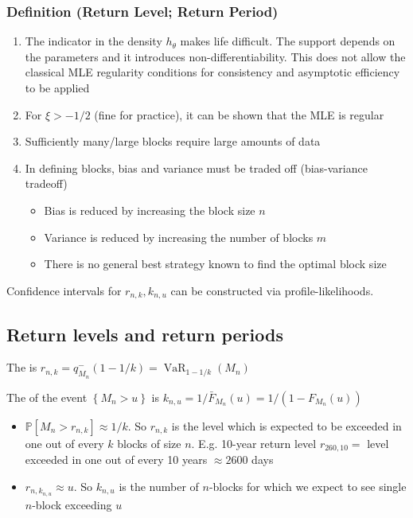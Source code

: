 \subsubsection*{Definition (Return Level; Return Period)}
\begin{enumerate}[label = (\arabic*), leftmargin=*]
    \item The indicator in the density $h_{\theta}$ makes life difficult. The support depends on the parameters and it introduces non-differentiability. This does not allow the classical MLE regularity conditions for consistency and asymptotic efficiency to be applied
    \item For $\xi>-1 / 2$ (fine for practice), it can be shown that the MLE is regular
    \item Sufficiently many/large blocks require large amounts of data
    \item In defining blocks, bias and variance must be traded off (bias-variance tradeoff)
    \begin{itemize}[leftmargin=*]
        \item Bias is reduced by increasing the block size $n$
        \item Variance is reduced by increasing the number of blocks $m$
        \item There is no general best strategy known to find the optimal block size
    \end{itemize}
\end{enumerate}
Confidence intervals for $r_{n, k}, k_{n, u}$ can be constructed via profile-likelihoods.


\subsection*{Return levels and return periods}
The  is $r_{n, k}=q_{M_{n}}^{-}(1-1 / k)=\operatorname{VaR}_{1-1 / k}\left(M_{n}\right)$

The  of the event $\left\{M_{n}>u\right\}$ is $k_{n, u}=1 / \bar{F}_{M_{n}}(u)=1 /\left(1-F_{M_{n}}(u)\right)$

\begin{itemize}[leftmargin=*]
    \item $\mathbb{P}\left[M_{n}>r_{n, k}\right] \approx 1 / k$. So $r_{n, k}$ is the level which is expected to be exceeded in one out of every $k$ blocks of size $n$. E.g. 10-year return level $r_{260,10}=$ level exceeded in one out of every 10 years $\approx 2600$ days
    \item $r_{n, k_{n, u}} \approx u$.
So $k_{n, u}$ is the number of $n$-blocks for which we expect to see single $n$-block exceeding $u$
\end{itemize}


